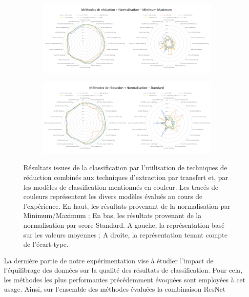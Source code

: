 \begin{figure}[H]
    \centering
    
    \begin{subfigure}{\textwidth}
      \includegraphics[width=\textwidth]{contents/chapter_4/resources/results_image_classification_reduction_mms.pdf}
    \end{subfigure}
    
    \begin{subfigure}{\textwidth}
      \includegraphics[width=\textwidth]{contents/chapter_4/resources/results_image_classification_reduction_ss.pdf}
    \end{subfigure}
    
    \caption{Résultats issues de la classification par l'utilisation de techniques de réduction combinés aux techniques d'extraction par transfert et, par les modèles de classification mentionnés en couleur. Les tracés de couleurs représentent les divers modèles évalués au cours de l'expérience. En haut, les résultats provenant de la normalisation par Minimum/Maximum ; En bas, les résultats provenant de la normalisation par score Standard. A gauche, la représentation basé sur les valeurs moyennes ; A droite, la représentation tenant compte de l'écart-type.}
    \label{fig:results_image_classification_reduction}
\end{figure}\par

La dernière partie de notre expérimentation vise à étudier l'impact de l'équilibrage des données sur la qualité des résultats de classification. Pour cela, les méthodes les plus performantes précédemment évoquées sont employées à cet usage. Ainsi, sur l'ensemble des méthodes évaluées la combinaison ResNet\par

